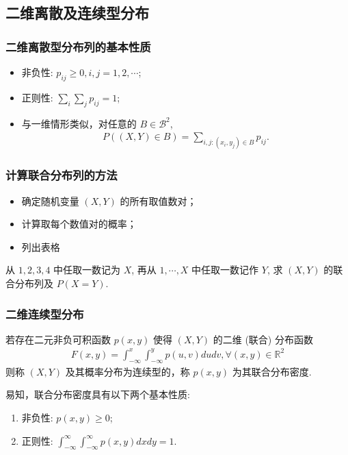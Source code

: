 \subsection{二维离散及连续型分布}
\begin{frame}
  \frametitle{二维离散型分布列的基本性质}
  \begin{itemize}[<+-|alert@+>]
  \item 非负性: $p_{ij}\ge 0, i,j=1,2,\cdots $;
  \item 正则性: $\sum_i\sum_jp_{ij}=1$;
  \item 与一维情形类似，对任意的 $B\in \mathcal{B}^2$,
    \begin{eqnarray*}
      P((X,Y)\in B)=\sum_{i, j: (x_i,y_j)\in B}p_{ij}.
    \end{eqnarray*}

  \end{itemize}
\end{frame}
\begin{frame}
  \frametitle{计算联合分布列的方法}
  \begin{itemize}[<+-|alert@+>]
  \item 确定随机变量 $(X, Y)$ 的所有取值数对；
  \item 计算取每个数值对的概率；
  \item 列出表格
  \end{itemize}
  \pause
  \begin{exam}
    从 $1,2,3,4$ 中任取一数记为 $X$, 再从 $1,\cdots,X$ 中任取一数记作 $Y$, 求 $(X,Y)$ 的联合分布列及 $P (X=Y)$.
  \end{exam}
\end{frame}
\begin{frame}
  \frametitle{二维连续型分布}
  \begin{defi}
    若存在二元非负可积函数 $p (x,y)$ 使得 $(X,Y)$ 的二维 (联合) 分布函数
    \begin{eqnarray*}
      F(x,y)=\int_{-\infty}^x\int_{-\infty}^yp(u,v)dudv, \forall (x,y)\in\mathbb{R}^2
    \end{eqnarray*}
    则称 $(X,Y)$ 及其概率分布为连续型的，称 $p (x,y)$ 为其联合分布密度.
  \end{defi}
  \vspace{0.5cm}

  \pause
  易知，联合分布密度具有以下两个基本性质:
  \begin{enumerate}[<+-|alert@+>]
  \item 非负性: $p (x,y)\ge 0$;
  \item 正则性: $\int_{-\infty}^\infty\int_{-\infty}^\infty p (x,y) dxdy=1$.
  \end{enumerate}



\end{frame}
